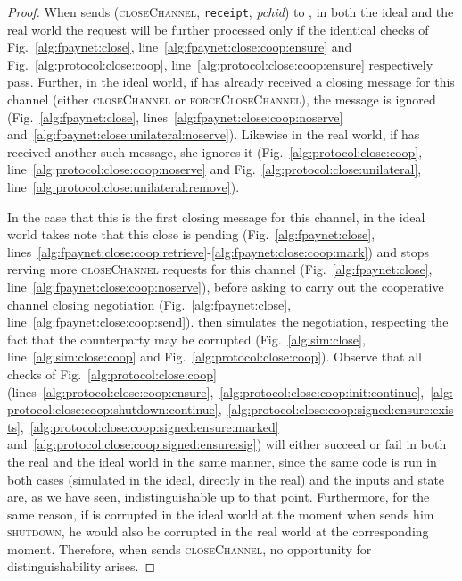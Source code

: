 \begin{proof}
  When \environment{} sends (\textsc{closeChannel}, \texttt{receipt},
  \textit{pchid}) to \alice, in both the ideal and the real world the request
  will be further processed only if the identical checks of
  Fig.~\ref{alg:fpaynet:close}, line~\ref{alg:fpaynet:close:coop:ensure} and
  Fig.~\ref{alg:protocol:close:coop}, line~\ref{alg:protocol:close:coop:ensure}
  respectively pass. Further, in the ideal world, if \alice{} has already
  received a closing message for this channel (either \textsc{closeChannel} or
  \textsc{forceCloseChannel}), the message is ignored
  (Fig.~\ref{alg:fpaynet:close}, lines~\ref{alg:fpaynet:close:coop:noserve}
  and~\ref{alg:fpaynet:close:unilateral:noserve}). Likewise in the real world,
  if \alice{} has received another such message, she ignores it
  (Fig.~\ref{alg:protocol:close:coop},
  line~\ref{alg:protocol:close:coop:noserve} and
  Fig.~\ref{alg:protocol:close:unilateral},
  line~\ref{alg:protocol:close:unilateral:remove}).

  In the case that this is the first closing message for this channel, in the
  ideal world \fpaynet{} takes note that this close is pending
  (Fig.~\ref{alg:fpaynet:close},
  lines~\ref{alg:fpaynet:close:coop:retrieve}-\ref{alg:fpaynet:close:coop:mark})
  and stops rerving more \textsc{closeChannel} requests for this channel
  (Fig.~\ref{alg:fpaynet:close}, line~\ref{alg:fpaynet:close:coop:noserve}),
  before asking \simulator{} to carry out the cooperative channel closing
  negotiation (Fig.~\ref{alg:fpaynet:close},
  line~\ref{alg:fpaynet:close:coop:send}). \simulator{} then simulates the
  negotiation, respecting the fact that the counterparty may be corrupted
  (Fig.~\ref{alg:sim:close}, line~\ref{alg:sim:close:coop} and
  Fig.~\ref{alg:protocol:close:coop}). Observe that all checks of
  Fig.~\ref{alg:protocol:close:coop}
  (lines~\ref{alg:protocol:close:coop:ensure},~\ref{alg:protocol:close:coop:init:continue},~\ref{alg:protocol:close:coop:shutdown:continue},~\ref{alg:protocol:close:coop:signed:ensure:exists},~\ref{alg:protocol:close:coop:signed:ensure:marked}
  and~\ref{alg:protocol:close:coop:signed:ensure:sig}) will either succeed or
  fail in both the real and the ideal world in the same manner, since the same
  code is run in both cases (simulated in the ideal, directly in the real) and
  the inputs and state are, as we have seen, indistinguishable up to that point.
  Furthermore, for the same reason, if \bob{} is corrupted in the ideal world at
  the moment when \alice{} sends him \textsc{shutdown}, he would also be
  corrupted in the real world at the corresponding moment. Therefore, when
  \environment{} sends \textsc{closeChannel}, no opportunity for
  distinguishability arises.


\end{proof}
